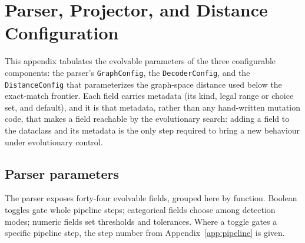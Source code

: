 \chapter{Parser, Projector, and Distance Configuration}
\label{app:config}

This appendix tabulates the evolvable parameters of the three configurable components:
the parser's \texttt{GraphConfig}, the \texttt{DecoderConfig}, and the
\texttt{DistanceConfig} that parameterizes the graph-space distance used below the
exact-match frontier. Each field carries metadata (its kind, legal range or choice set,
and default), and it is that metadata, rather than any hand-written mutation code, that
makes a field reachable by the evolutionary search: adding a field to the dataclass and
its metadata is the only step required to bring a new behaviour under evolutionary
control.

\section{Parser parameters}
\label{app:graphconfig}

The parser exposes forty-four evolvable fields, grouped here by function. Boolean toggles
gate whole pipeline steps; categorical fields choose among detection modes; numeric fields
set thresholds and tolerances. Where a toggle gates a specific pipeline step, the step
number from Appendix~\ref{app:pipeline} is given.

